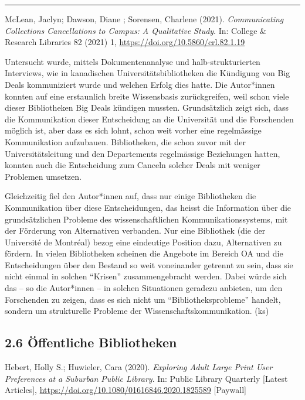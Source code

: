 \documentclass[a4paper,
fontsize=11pt,
oneside,
numbers=noperiodatend,
parskip=half-,
bibliography=totoc,
final
]{scrartcl}
\begin{document}
\begin{center}\rule{0.5\linewidth}{0.5pt}\end{center}

McLean, Jaclyn; Dawson, Diane ; Sorensen, Charlene (2021).
\emph{Communicating Collections Cancellations to Campus: A Qualitative
Study}. In: College \& Research Libraries 82 (2021) 1,
\url{https://doi.org/10.5860/crl.82.1.19}

Untersucht wurde, mittels Dokumentenanalyse und halb-strukturierten
Interviews, wie in kanadischen Universitätsbibliotheken die Kündigung
von Big Deals kommuniziert wurde und welchen Erfolg dies hatte. Die
Autor*innen konnten auf eine erstaunlich breite Wissensbasis
zurückgreifen, weil schon viele dieser Bibliotheken Big Deals kündigen
mussten. Grundsätzlich zeigt sich, dass die Kommunikation dieser
Entscheidung an die Universität und die Forschenden möglich ist, aber
dass es sich lohnt, schon weit vorher eine regelmässige Kommunikation
aufzubauen. Bibliotheken, die schon zuvor mit der Universitätsleitung
und den Departements regelmässige Beziehungen hatten, konnten auch die
Entscheidung zum Canceln solcher Deals mit weniger Problemen umsetzen.

Gleichzeitig fiel den Autor*innen auf, dass nur einige Bibliotheken die
Kommunikation über diese Entscheidungen, das heisst die Information über
die grundsätzlichen Probleme des wissenschaftlichen
Kommunikationssystems, mit der Förderung von Alternativen verbanden. Nur
eine Bibliothek (die der Université de Montréal) bezog eine eindeutige
Position dazu, Alternativen zu fördern. In vielen Bibliotheken scheinen
die Angebote im Bereich OA und die Entscheidungen über den Bestand so
weit voneinander getrennt zu sein, dass sie nicht einmal in solchen
\enquote{Krisen} zusammengebracht werden. Dabei würde sich das -- so die
Autor*innen -- in solchen Situationen geradezu anbieten, um den
Forschenden zu zeigen, dass es sich nicht um
\enquote{Bibliotheksprobleme} handelt, sondern um strukturelle Probleme
der Wissenschaftskommunikation. (ks)

\hypertarget{uxf6ffentliche-bibliotheken}{%
\subsection{2.6 Öffentliche
Bibliotheken}\label{uxf6ffentliche-bibliotheken}}

Hebert, Holly S.; Huwieler, Cara (2020). \emph{Exploring Adult Large
Print User Preferences at a Suburban Public Library}. In: Public Library
Quarterly {[}Latest Articles{]},
\url{https://doi.org/10.1080/01616846.2020.1825589} {[}Paywall{]}
\end{document}
